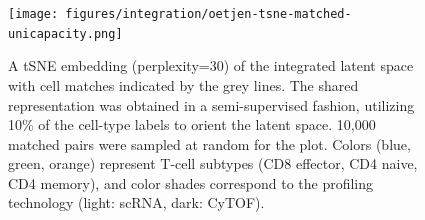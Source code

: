\begin{figure}[htb]
    \centering
    \texttt{[image: figures/integration/oetjen-tsne-matched-unicapacity.png]}
    \caption{
    A tSNE embedding (perplexity=30) of the integrated latent space with cell matches indicated by the grey lines.
    The shared representation was obtained in a semi-supervised fashion, utilizing 10\% of the cell-type labels to orient the latent space. 10,000 matched pairs were sampled at random for the plot.
    Colors (blue, green, orange) represent T-cell subtypes (CD8 effector, CD4 naive, CD4 memory), and color shades correspond to the profiling technology (light: scRNA, dark: CyTOF).}
    \label{fig:oetjen_tsne_uni}
\end{figure}
